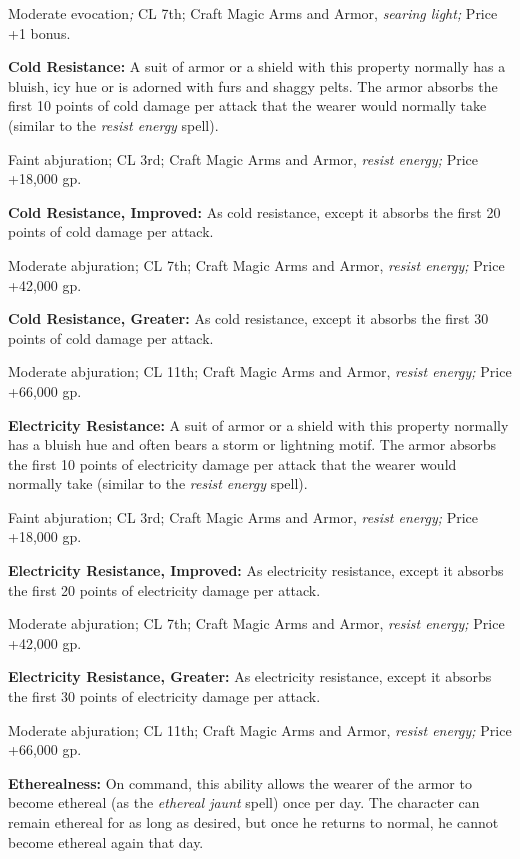 \documentclass{article}
\begin{document}
Moderate evocation\textit{; }CL 7th; Craft Magic Arms and Armor, \textit{searing 
light; }Price +1 bonus.

\textbf{Cold Resistance:} A suit of armor or a shield with this property normally 
has a bluish, icy hue or is adorned with furs and shaggy pelts. The armor absorbs 
the first 10 points of cold damage per attack that the wearer would normally take 
(similar to the \textit{resist energy }spell).

Faint abjuration; CL 3rd; Craft Magic Arms and Armor, \textit{resist energy; }Price 
+18,000 gp.

\textbf{Cold Resistance, Improved:} As cold resistance, except it absorbs the first 
20 points of cold damage per attack.

Moderate abjuration; CL 7th; Craft Magic Arms and Armor, \textit{resist energy; 
}Price +42,000 gp.

\textbf{Cold Resistance, Greater:} As cold resistance, except it absorbs the first 
30 points of cold damage per attack.

Moderate abjuration; CL 11th; Craft Magic Arms and Armor, \textit{resist energy; 
}Price +66,000 gp.

\textbf{Electricity Resistance:} A suit of armor or a shield with this property 
normally has a bluish hue and often bears a storm or lightning motif. The armor 
absorbs the first 10 points of electricity damage per attack that the wearer would 
normally take (similar to the \textit{resist energy }spell).

Faint abjuration; CL 3rd; Craft Magic Arms and Armor, \textit{resist energy; }Price 
+18,000 gp.

\textbf{Electricity Resistance, Improved: }As electricity resistance, except it 
absorbs the first 20 points of electricity damage per attack.

Moderate abjuration; CL 7th; Craft Magic Arms and Armor, \textit{resist energy; 
}Price +42,000 gp.

\textbf{Electricity Resistance, Greater: }As electricity resistance, except it 
absorbs the first 30 points of electricity damage per attack.

Moderate abjuration; CL 11th; Craft Magic Arms and Armor, \textit{resist energy; 
}Price +66,000 gp.

\textbf{Etherealness:} On command, this ability allows the wearer of the armor 
to become ethereal (as the \textit{ethereal jaunt }spell) once per day. The character 
can remain ethereal for as long as desired, but once he returns to normal, he cannot 
become ethereal again that day.
\end{document}
